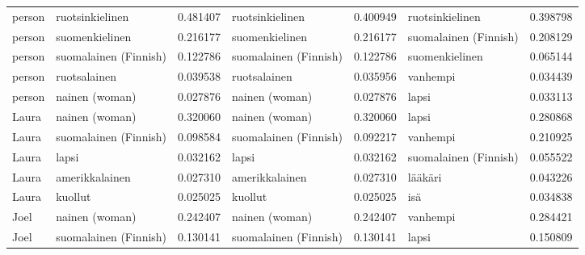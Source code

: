 \begin{tabular}{llrlrlr}
person &       ruotsinkielinen &                         0.481407 &        ruotsinkielinen &                              0.400949 &       ruotsinkielinen &                        0.398798 \\
person &        suomenkielinen &                         0.216177 &         suomenkielinen &                              0.216177 & suomalainen (Finnish) &                        0.208129 \\
person & suomalainen (Finnish) &                         0.122786 &  suomalainen (Finnish) &                              0.122786 &        suomenkielinen &                        0.065144 \\
person &          ruotsalainen &                         0.039538 &           ruotsalainen &                              0.035956 &              vanhempi &                        0.034439 \\
person &        nainen (woman) &                         0.027876 &         nainen (woman) &                              0.027876 &                 lapsi &                        0.033113 \\
 Laura &        nainen (woman) &                         0.320060 &         nainen (woman) &                              0.320060 &                 lapsi &                        0.280868 \\
 Laura & suomalainen (Finnish) &                         0.098584 &  suomalainen (Finnish) &                              0.092217 &              vanhempi &                        0.210925 \\
 Laura &                 lapsi &                         0.032162 &                  lapsi &                              0.032162 & suomalainen (Finnish) &                        0.055522 \\
 Laura &        amerikkalainen &                         0.027310 &         amerikkalainen &                              0.027310 &               lääkäri &                        0.043226 \\
 Laura &               kuollut &                         0.025025 &                kuollut &                              0.025025 &                   isä &                        0.034838 \\
  Joel &        nainen (woman) &                         0.242407 &         nainen (woman) &                              0.242407 &              vanhempi &                        0.284421 \\
  Joel & suomalainen (Finnish) &                         0.130141 &  suomalainen (Finnish) &                              0.130141 &                 lapsi &                        0.150809 \\

\end{tabular}

